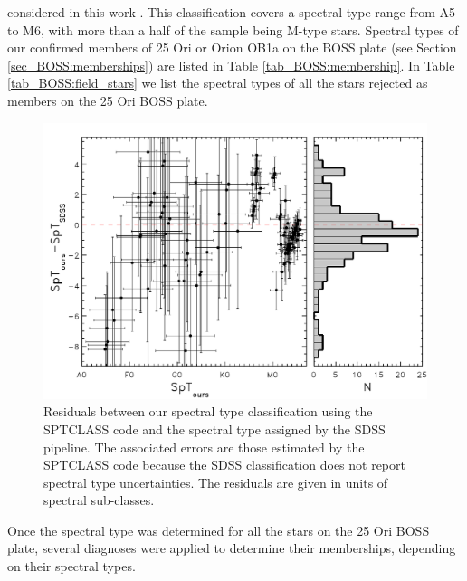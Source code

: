 \documentclass[12pt]{article}
\newcounter{subsubsubsection}[subsubsection]
\begin{document}
considered in this work \citep[e.g.][]{Briceno2007, Hernandez2007b, Downes2014}. This classification covers a spectral type range from A5 to M6, with more than a half of the sample being M-type stars. Spectral types of our confirmed members of 25 Ori or Orion OB1a on the BOSS plate (see Section \ref{sec_BOSS:memberships}) are listed in Table \ref{tab_BOSS:membership}. In Table \ref{tab_BOSS:field_stars} we list the spectral types of all the stars rejected as members on the 25 Ori BOSS plate.

\begin{figure}[ht!]
	\begin{minipage}{0.60\textwidth}
		\includegraphics[width=1\textwidth]{f4.pdf}
	\end{minipage} \hfill
	\begin{minipage}{0.35\textwidth}
		\caption[SpT residuals between our classification and that from SDSS]{Residuals between our spectral type classification using the SPTCLASS code \citep{Hernandez2004} and the spectral type assigned by the SDSS pipeline. The associated errors are those estimated by the SPTCLASS code because the SDSS classification does not report spectral type uncertainties. The residuals are given in units of spectral sub-classes.}
		\label{fig_BOSS:sptclass}
	\end{minipage}
\end{figure}

\label{sec_BOSS:memberships}

Once the spectral type was determined for all the stars on the 25 Ori BOSS plate, several diagnoses were applied to determine their memberships, depending on their spectral types.
\end{document}
